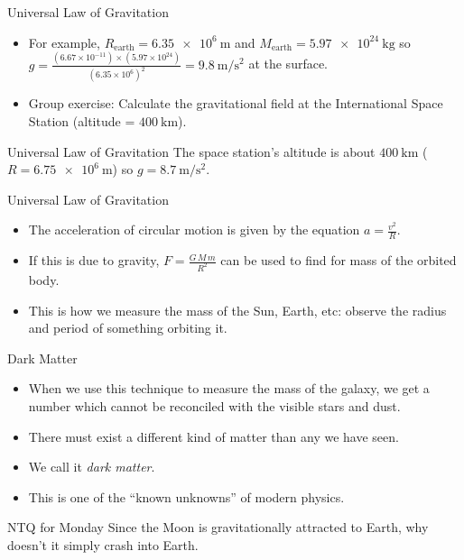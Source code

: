 \documentclass[english]{beamer}
\begin{document}
\begin{frame}{Universal Law of Gravitation}
  \begin{itemize}
    \item For example, $R_{\text{earth}}=\SI{6.35e6}{\meter}$ and $M_{\text{earth}}=\SI{5.97e24}{\kilogram}$ so $g=\frac{\left(6.67\times10^{-11}\right) \times \left(5.97\times10^{24}\right)}{\left(6.35\times10^6\right)^2}=\SI{9.8}{\meter\per\second^2}$ at the surface.
    \item Group exercise: Calculate the gravitational field at the International Space Station (altitude = $\SI{400}{\km}$).
  \end{itemize}
\end{frame}

\begin{frame}{Universal Law of Gravitation}
  The space station's altitude is about $\SI{400}{\km}$ ($R=\SI{6.75e6}{\meter}$) so $g=\SI{8.7}{\meter\per\second^2}$.
\end{frame}

\begin{frame}{Universal Law of Gravitation}
  \begin{itemize}
    \item The acceleration of circular motion is given by the equation $a=\frac{v^2}{R}$.
    \item If this is due to gravity, $F=\frac{G\,M\,m}{R^2}$ can be used to find for mass of the orbited body.
    \item This is how we measure the mass of the Sun, Earth, etc: observe the radius and period of something orbiting it.
  \end{itemize}
\end{frame}

\begin{frame}{Dark Matter}
  \begin{itemize}
    \item When we use this technique to measure the mass of the galaxy, we get a number which cannot be reconciled with the visible stars and dust.
    \item There must exist a different kind of matter than any we have seen.
    \item We call it \emph{dark matter}.
    \item This is one of the ``known unknowns'' of modern physics.
  \end{itemize}
\end{frame}

\begin{frame}{NTQ for Monday}
  Since the Moon is gravitationally attracted to Earth, why doesn't it simply crash into Earth.
\end{frame}
\end{document}
